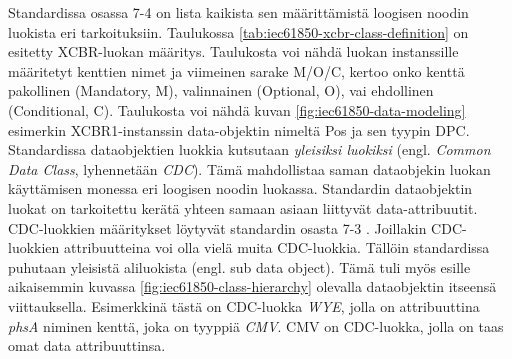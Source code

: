 Standardissa osassa 7-4 on lista kaikista sen määrittämistä loogisen noodin luokista eri tarkoituksiin. Taulukossa \ref{tab:iec61850-xcbr-class-definition} on esitetty XCBR-luokan määritys. Taulukosta voi nähdä luokan instanssille määritetyt kenttien nimet ja viimeinen sarake M/O/C, kertoo onko kenttä pakollinen (Mandatory, M), valinnainen (Optional, O), vai ehdollinen (Conditional, C). Taulukosta voi nähdä kuvan \ref{fig:iec61850-data-modeling} esimerkin XCBR1-instanssin data-objektin nimeltä Pos ja sen tyypin DPC. Standardissa dataobjektien luokkia kutsutaan \emph{yleisiksi luokiksi} (engl. \emph{Common Data Class}, lyhennetään \emph{CDC}). Tämä mahdollistaa saman dataobjekin luokan käyttämisen monessa eri loogisen noodin luokassa. Standardin dataobjektin luokat on tarkoitettu kerätä yhteen samaan asiaan liittyvät data-attribuutit. CDC-luokkien määritykset löytyvät standardin osasta 7-3 \mbox{\cite[s.~26]{IEC61850-1}}. Joillakin CDC-luokkien attribuutteina voi olla vielä muita CDC-luokkia. Tällöin standardissa puhutaan yleisistä aliluokista (engl. sub data object). Tämä tuli myös esille aikaisemmin kuvassa \ref{fig:iec61850-class-hierarchy} olevalla dataobjektin itseensä viittauksella. Esimerkkinä tästä on CDC-luokka \emph{WYE}, jolla on attribuuttina \emph{phsA} niminen kenttä, joka on tyyppiä \emph{CMV}. CMV on CDC-luokka, jolla on taas omat data attribuuttinsa. \mbox{\cite[s.~51,61]{IEC61850-7-2}} \mbox{\cite[s.~36]{IEC61850-7-3}}

